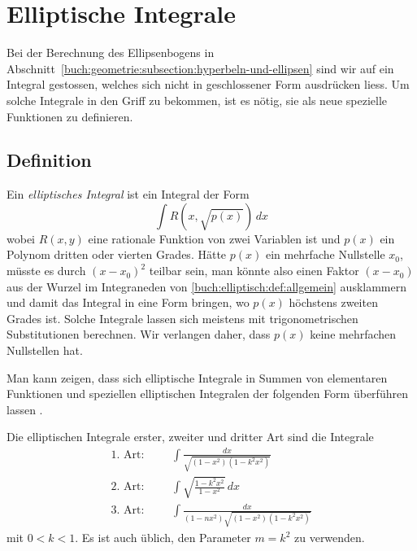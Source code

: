 %
%
%
\section{Elliptische Integrale
\label{buch:elliptisch:section:integral}}
Bei der Berechnung des Ellipsenbogens in 
Abschnitt~\ref{buch:geometrie:subsection:hyperbeln-und-ellipsen}
sind wir auf ein Integral gestossen, welches sich nicht in geschlossener
Form ausdrücken liess.
Um solche Integrale in den Griff zu bekommen, ist es nötig, sie als
neue spezielle Funktionen zu definieren.

\subsection{Definition
\label{buch:elliptisch:subsection:definition}}
Ein {\em elliptisches Integral} ist ein Integral der Form
%
%
\begin{equation}
\int R\left( x, \sqrt{p(x)}\right)\,dx
\label{buch:elliptisch:def:allgemein}
\end{equation}
wobei $R(x,y)$ eine rationale Funktion von zwei Variablen ist und
$p(x)$ ein Polynom dritten oder vierten Grades.
Hätte $p(x)$ ein mehrfache Nullstelle $x_0$, müsste es durch $(x-x_0)^2$
teilbar sein, man könnte also einen Faktor $(x-x_0)$ aus der
Wurzel im Integraneden von \eqref{buch:elliptisch:def:allgemein}
ausklammern und damit das Integral in eine Form bringen, wo $p(x)$
höchstens zweiten Grades ist.
Solche Integrale lassen sich meistens mit trigonometrischen Substitutionen
berechnen.
Wir verlangen daher, dass $p(x)$ keine mehrfachen Nullstellen hat.

Man kann zeigen, dass sich elliptische Integrale in Summen von
elementaren Funktionen und speziellen elliptischen Integralen 
der folgenden Form überführen lassen
\cite[Abschnitt 164, p.~506]{buch:smirnov32}.

\begin{definition}
\label{buch:elliptisch:def:integrale123}
Die elliptischen Integrale erster, zweiter und dritter Art sind die
Integrale
\[
\begin{aligned}
\text{1.~Art:}&&&
\int \frac{dx}{\sqrt{(1-x^2)(1-k^2x^2)}}
\\
\text{2.~Art:}&&&
\int \sqrt{\frac{1-k^2x^2}{1-x^2}}\,dx
\\
\text{3.~Art:}&&&
\int \frac{dx}{(1-nx^2)\sqrt{(1-x^2)(1-k^2x^2)}}
\end{aligned}
\]
mit $0<k<1$.
Es ist auch üblich, den Parameter $m=k^2$ zu verwenden.
\end{definition}

